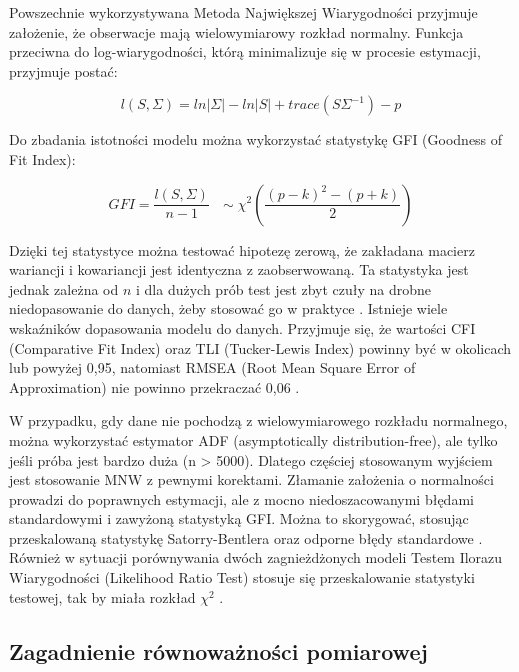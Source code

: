 \documentclass[12pt]{article}
\begin{document}
Powszechnie wykorzystywana Metoda Największej Wiarygodności przyjmuje założenie, że obserwacje mają wielowymiarowy rozkład normalny. Funkcja przeciwna do log-wiarygodności, którą minimalizuje się w procesie estymacji, przyjmuje postać:

\begin{equation}
\label{eq:loglikelihood}
l(S, \Sigma) = ln|\Sigma| - ln|S| + trace(S \Sigma^{-1}) - p
\end{equation}

Do zbadania istotności modelu można wykorzystać statystykę GFI (Goodness of Fit Index):

\begin{equation}
\label{eq:gfi}
GFI = \frac{l(S, \Sigma)}{n-1} \text{   } \sim \chi^2 (\frac{(p-k)^2 - (p+k)}{2})
\end{equation}

Dzięki tej statystyce można testować hipotezę zerową, że zakładana macierz wariancji i kowariancji jest identyczna z zaobserwowaną. Ta statystyka jest jednak zależna od \(n\) i dla dużych prób test jest zbyt czuły na drobne niedopasowanie do danych, żeby stosować go w praktyce \citep{CheungRens}. Istnieje wiele wskaźników dopasowania modelu do danych. Przyjmuje się, że wartości CFI (Comparative Fit Index) oraz TLI (Tucker-Lewis Index) powinny być w okolicach lub powyżej 0,95, natomiast RMSEA (Root Mean Square Error of Approximation) nie powinno przekraczać 0,06 \citep{HuBentler}.

W przypadku, gdy dane nie pochodzą z wielowymiarowego rozkładu normalnego, można wykorzystać estymator ADF (asymptotically distribution-free), ale tylko jeśli próba jest bardzo duża (n \textgreater{} 5000). Dlatego częściej stosowanym wyjściem jest stosowanie MNW z pewnymi korektami. Złamanie założenia o normalności prowadzi do poprawnych estymacji, ale z mocno niedoszacowanymi błędami standardowymi i zawyżoną statystyką GFI. Można to skorygować, stosując przeskalowaną statystykę Satorry-Bentlera oraz odporne błędy standardowe \citep{Rosseel}. Również w sytuacji porównywania dwóch zagnieżdżonych modeli Testem Ilorazu Wiarygodności (Likelihood Ratio Test) stosuje się przeskalowanie statystyki testowej, tak by miała rozkład \(\chi^2\) \citep{SatorraBentler}.

\hypertarget{zagadnienie-ruxf3wnowaux17cnoux15bci-pomiarowej}{%
\subsection{Zagadnienie równoważności pomiarowej}\label{zagadnienie-ruxf3wnowaux17cnoux15bci-pomiarowej}}
\end{document}
